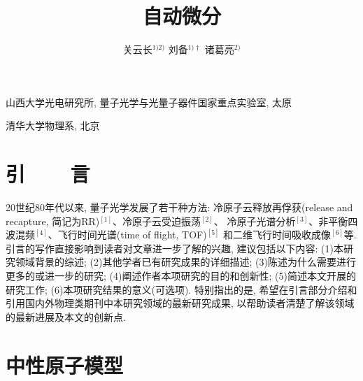 \documentclass[fontset=ubuntu,A4,twoside]{ctexart}
\begin{document}
\apsname

\title{自动微分 \fivestar}%

\author{关云长$^{1)2)}$ \quad 刘备$^{1)\dag}$ \quad 诸葛亮$^{2)}$}

\address{1)}{山西大学光电研究所, 量子光学与光量子器件国家重点实验室, 太原 }

\address{2)}{清华大学物理系, 北京 }









\section{引~~~~言}


20世纪80年代以来, 量子光学发展了若干种方法: 冷原子云释放再俘获(release and
recapture, 简记为RR)$^{[1]}$、冷原子云受迫振荡$^{[2]}$、 冷原子光谱分析$^{[3]}$、非平衡四波混频$^{[4]}$、飞行时间光谱(time
of flight, TOF)$^{[5]}$ 和二维飞行时间吸收成像$^{[6]}$等. 引言的写作直接影响到读者对文章进一步了解的兴趣, 建议包括以下内容:
(1)本研究领域背景的综述; (2)其他学者已有研究成果的详细描述;
(3)陈述为什么需要进行更多的或进一步的研究;
(4)阐述作者本项研究的目的和创新性; (5)简述本文开展的研究工作;
(6)本项研究结果的意义(可选项). 特别指出的是, 希望在引言部分介绍和引用国内外物理类期刊中本研究领域的最新研究成果, 以帮助读者清楚了解该领域的最新进展及本文的创新点.

\section{中性原子模型}
\end{document}
